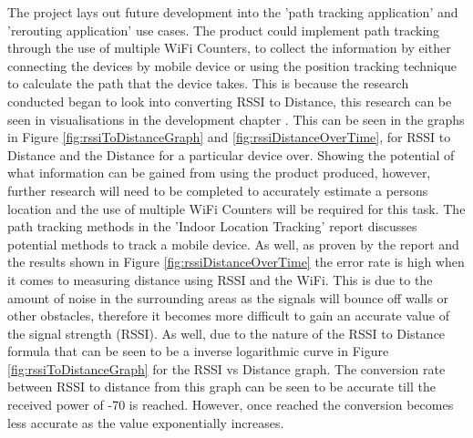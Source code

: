 \documentclass{report}
\begin{document}
The project lays out future development into the 'path tracking application' and 'rerouting application' use cases. The product could implement path tracking through the use of multiple WiFi Counters, to collect the information by either connecting the devices by mobile device or using the position tracking technique to calculate the path that the device takes.  This is because the research conducted began to look into converting RSSI to Distance, this research can be seen in visualisations in the development chapter . This can be seen in the graphs in Figure \ref{fig:rssiToDistanceGraph} and \ref{fig:rssiDistanceOverTime}, for RSSI to Distance and the Distance for a particular device over. Showing the potential of what information can be gained from using the product produced, however, further research will need to be completed to accurately estimate a persons location and the use of multiple WiFi Counters will be required for this task. The path tracking methods in the 'Indoor Location Tracking'\cite{IndoorTrackingRSSI} report discusses potential methods to track a mobile device. As well, as proven by the report and the results shown in Figure \ref{fig:rssiDistanceOverTime} the error rate is high when it comes to measuring distance using RSSI and the WiFi. This is due to the amount of noise in the surrounding areas as the signals will bounce off walls or other obstacles, therefore it becomes more difficult to gain an accurate value of the signal strength (RSSI).  As well, due to the nature of the RSSI to Distance formula that can be seen to be a inverse logarithmic curve in Figure \ref{fig:rssiToDistanceGraph} for the RSSI vs Distance graph. The conversion rate between RSSI to distance from this graph can be seen to be accurate till the received power of -70 is reached. However, once reached the conversion becomes less accurate as the value exponentially increases.\\ \newline
\end{document}
